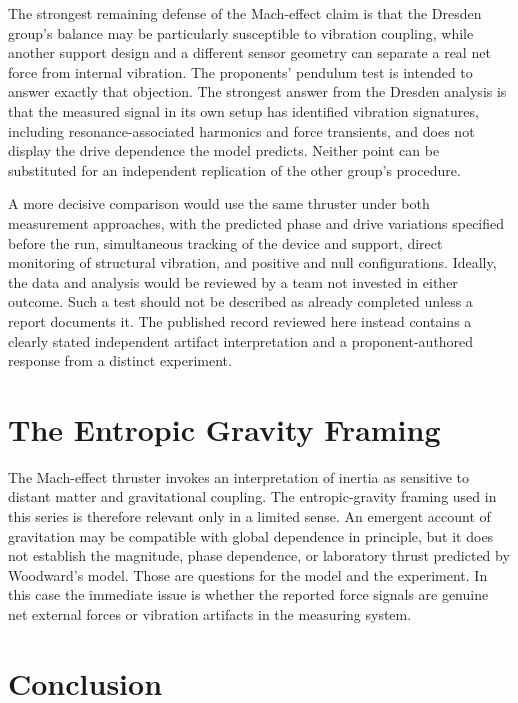 \documentclass[11pt]{article}
\begin{document}
The strongest remaining defense of the Mach-effect claim is that the Dresden group's balance may be particularly susceptible to vibration coupling, while another support design and a different sensor geometry can separate a real net force from internal vibration. The proponents' pendulum test is intended to answer exactly that objection. The strongest answer from the Dresden analysis is that the measured signal in its own setup has identified vibration signatures, including resonance-associated harmonics and force transients, and does not display the drive dependence the model predicts. Neither point can be substituted for an independent replication of the other group's procedure.

A more decisive comparison would use the same thruster under both measurement approaches, with the predicted phase and drive variations specified before the run, simultaneous tracking of the device and support, direct monitoring of structural vibration, and positive and null configurations. Ideally, the data and analysis would be reviewed by a team not invested in either outcome. Such a test should not be described as already completed unless a report documents it. The published record reviewed here instead contains a clearly stated independent artifact interpretation and a proponent-authored response from a distinct experiment.

\section{The Entropic Gravity Framing}

The Mach-effect thruster invokes an interpretation of inertia as sensitive to distant matter and gravitational coupling. The entropic-gravity framing used in this series is therefore relevant only in a limited sense. An emergent account of gravitation may be compatible with global dependence in principle, but it does not establish the magnitude, phase dependence, or laboratory thrust predicted by Woodward's model. Those are questions for the model and the experiment. In this case the immediate issue is whether the reported force signals are genuine net external forces or vibration artifacts in the measuring system.

\section{Conclusion}
\end{document}
